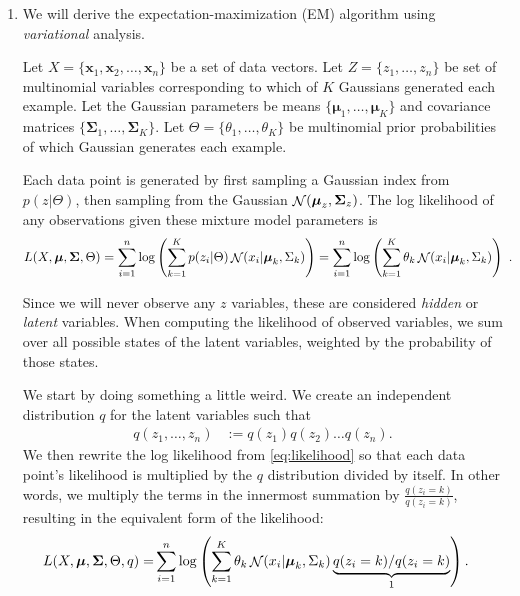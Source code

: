 \documentclass[10pt]{article}
\newcommand{\bx}{{\boldsymbol x}}
\newcommand{\bmu}{{\boldsymbol \mu}}
\newcommand{\bSigma}{{\boldsymbol \Sigma}}
\DeclareMathOperator*{\normal}{{\cal N}}
\begin{document}
\begin{enumerate}

\item We will derive the expectation-maximization (EM) algorithm using \textit{variational} analysis. 

Let $X = \{\bx_1, \bx_2, \ldots, \bx_n\}$ be a set of data vectors. Let $Z = \{z_1, \ldots, z_n\}$ be set of multinomial variables corresponding to which of $K$ Gaussians generated each example. Let the Gaussian parameters be means $\{\bmu_1, \ldots, \bmu_K\}$ and covariance matrices $\{\bSigma_1, \ldots, \bSigma_K\}$. Let $\Theta = \{\theta_1, \ldots, \theta_K\}$ be multinomial prior probabilities of which Gaussian generates each example.

Each data point is generated by first sampling a Gaussian index from $p(z | \Theta)$, then sampling from the Gaussian $\normal(\bmu_z, \bSigma_z)$. The log likelihood of any observations given these mixture model parameters is
\begin{align}
L(X, \bmu, \bSigma, \Theta) &= \sum_{i=1}^n \log \left(\sum_{k = 1}^K p(z_i | \Theta) \normal(x_i | \bmu_k, \Sigma_k) \right)
= \sum_{i=1}^n \log \left(\sum_{k = 1}^K \theta_k \normal(x_i | \bmu_k, \Sigma_k) \right) ~.
\label{eq:likelihood}
\end{align}

Since we will never observe any $z$ variables, these are considered \textit{hidden} or \textit{latent} variables. When computing the likelihood of observed variables, we sum over all possible states of the latent variables, weighted by the probability of those states.

We start by doing something a little weird. We create an independent distribution $q$ for the latent variables such that
\begin{align}
q(z_1, \ldots, z_n) &:= q(z_1) q(z_2) \ldots q(z_n).
\end{align}
We then rewrite the log likelihood from \cref{eq:likelihood} so that each data point's likelihood is multiplied by the $q$ distribution divided by itself. In other words, we multiply the terms in the innermost summation by $\frac{q(z_i = k)}{q(z_i = k)}$, resulting in the equivalent form of the likelihood:
\begin{align}
L(X, \bmu, \bSigma, \Theta, q) =& \sum_{i=1}^n \log \left(\sum_{k = 1}^K \theta_k \normal(x_i | \bmu_k, \Sigma_k) \underbrace{q(z_i = k) / q(z_i = k)}_{1} \right) .
\end{align}


\end{enumerate}
\end{document}
